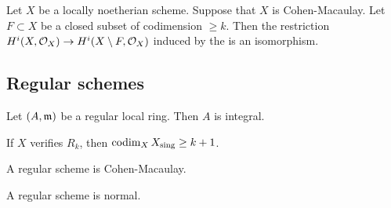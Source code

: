     \begin{theorem}
        Let $X$ be a locally noetherian scheme.
        Suppose that $X$ is Cohen-Macaulay.
        Let $F \subset X$ be a closed subset of codimension $\geq k$.
        Then the restriction $H^i(X,{\mathcal{O}}_X) \to H^i(X\setminus F, {\mathcal{O}}_{X})$ induced by the 
         is an isomorphism.
    \end{theorem}


    
\subsection{Regular schemes}

    \begin{proposition}
        Let $(A,{\mathfrak{m}})$ be a regular local ring.
        Then $A$ is integral.
    \end{proposition}

    \begin{proposition}
        If $X$ verifies $R_k$, then $\operatorname{codim}_X X_{\text{sing}} \geq k+1$.
    \end{proposition}

    \begin{proposition}
        A regular scheme is Cohen-Macaulay.
    \end{proposition}

    \begin{corollary}
        A regular scheme is normal.
    \end{corollary}



